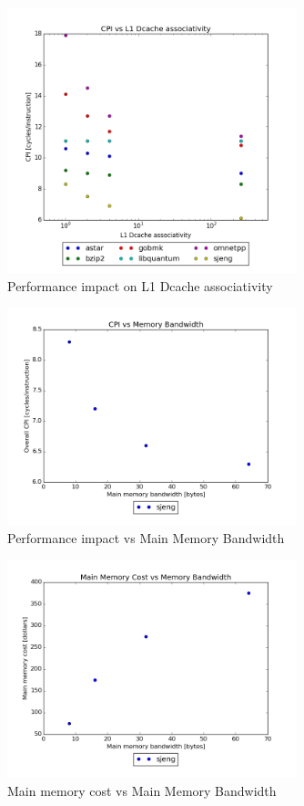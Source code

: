 \documentclass{article}
\begin{document}
\begin{figure}[ht]
    \centering
    \includegraphics[width=0.75\textwidth]{plots/CPI_vs_L1Dcache_associativity.png}
    \caption{Performance impact on L1 Dcache associativity}
    \label{fig:cpivsl1assoc}
\end{figure}

\begin{figure}[ht]
    \centering
    \includegraphics[width=0.75\textwidth]{plots/CPI_vs_Bandwidth.png}
    \caption{Performance impact vs Main Memory Bandwidth}
    \label{fig:cpivsbandwidth}
\end{figure}

\begin{figure}[ht]
    \centering
    \includegraphics[width=0.75\textwidth]{plots/Cost_vs_Bandwidth.png}
    \caption{Main memory cost vs Main Memory Bandwidth}
    \label{fig:costvsbandwidth}
\end{figure}
\end{document}

